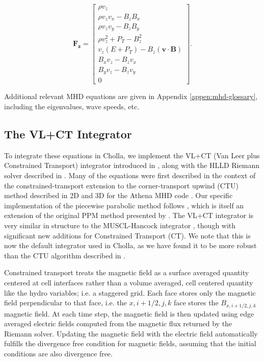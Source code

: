 \begin{equation}
    \boldsymbol{F_z} = \begin{bmatrix}
            \rho v_{z} \\
            \rho v_{z} v_{x} - B_{z} B_{x} \\
            \rho v_{z} v_{y} - B_{z} B_{y} \\
            \rho v_{z}^2 + P_{T} - B_{z}^2 \\
            v_{z} \left( E + P_{T} \right) - B_{z} \left( \boldsymbol{v} \cdot \boldsymbol{B} \right) \\
            B_{x} v_{z} - B_{z} v_{x} \\
            B_{y} v_{z} - B_{z} v_{y} \\
            0
         \end{bmatrix}.
\end{equation}

Additional relevant MHD equations are given in Appendix \ref{appen:mhd-glossary}, including the eigenvalues, wave speeds, etc.



\subsection{The VL+CT Integrator}
\label{sec:vlct-summary}

To integrate these equations in Cholla, we implement the VL+CT (Van Leer plus Constrained Transport) integrator introduced in \cite{stone_2009}, along with the HLLD Riemann solver described in \cite{hlld_2005}. Many of the equations were first described in the context of the constrained-transport extension to the corner-transport upwind (CTU) method \citep{colella_1990} described in 2D \citep{gardiner_2005} and 3D \citep{gardiner_unsplit_2008} for the Athena MHD code \citep{stone_athena_2008}. Our specific implementation of the piecewise parabolic method follows \cite{felker_2018}, which is itself an extension of the original PPM method presented by \cite{colella_1984}. The VL+CT integrator is very similar in structure to the MUSCL-Hancock integrator \citep{van_leer_2006, falle_1991, Toro}, though with significant new additions for Constrained Transport (CT). We note that this is now the default integrator used in Cholla, as we have found it to be more robust than the CTU algorithm described in \cite{schneider_2015}.

Constrained transport treats the magnetic field as a surface averaged quantity centered at cell interfaces rather than a volume averaged, cell centered quantity like the hydro variables; i.e. a staggered grid. Each face stores only the magnetic field perpendicular to that face, i.e. the $x,i+1/2,j,k$ face stores the $B_{x,i+1/2,j,k}$ magnetic field. At each time step, the magnetic field is then updated using edge averaged electric fields computed from the magnetic flux returned by the Riemann solver. Updating the magnetic field with the electric field automatically fulfills the divergence free condition for magnetic fields, assuming that the initial conditions are also divergence free.

